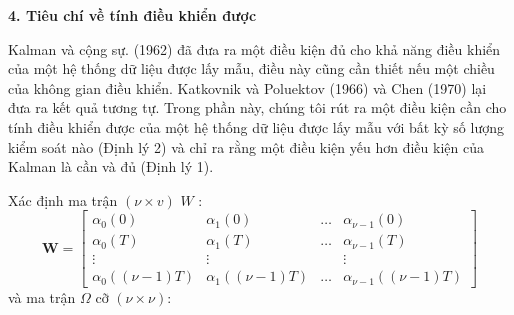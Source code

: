 \documentclass[12pt,a4paper]{article}
\begin{document}
\textbf{4. Tiêu chí về tính điều khiển được}

Kalman và cộng sự. (1962) đã đưa ra một điều kiện đủ cho khả năng điều khiển của một hệ thống dữ liệu được lấy mẫu, điều này cũng cần thiết nếu một chiều của không gian điều khiển. Katkovnik và Poluektov (1966) và Chen (1970) lại đưa ra kết quả tương tự. Trong phần này, chúng tôi rút ra một điều kiện cần  cho tính điều khiển được của một hệ thống dữ liệu được lấy mẫu với bất kỳ số lượng kiểm soát nào (Định lý 2) và chỉ ra rằng một điều kiện yếu hơn điều kiện của Kalman là cần và đủ (Định lý 1).

Xác định ma trận $(\nu \times v)$ $W$ :
\begin{equation}\tag{9}\label{pt9}
	\mathbf{W}=\left[\begin{array}{cccc}
		\alpha_0(0) & \alpha_1(0) & \ldots & \alpha_{\nu-1}(0) \\
		\alpha_0(T) & \alpha_1(T) & \ldots & \alpha_{\nu-1}(T) \\
		\vdots & \vdots & & \vdots \\
		\alpha_0((\nu-1) T) & \alpha_1((\nu-1) T) & \ldots & \alpha_{\nu-1}((\nu-1) T)
	\end{array}\right]
\end{equation}
và ma trận $\Omega$ cỡ $(\nu \times \nu)$:
\end{document}
